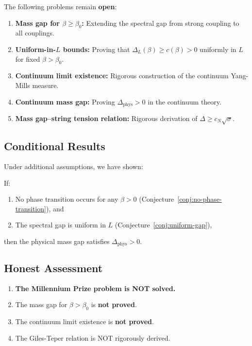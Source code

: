 The following problems remain \textbf{open}:

\begin{enumerate}
    \item \textbf{Mass gap for $\beta \geq \beta_0$:} Extending the spectral gap from strong coupling to all couplings.
    
    \item \textbf{Uniform-in-$L$ bounds:} Proving that $\Delta_L(\beta) \geq c(\beta) > 0$ uniformly in $L$ for fixed $\beta > \beta_0$.
    
    \item \textbf{Continuum limit existence:} Rigorous construction of the continuum Yang-Mills measure.
    
    \item \textbf{Continuum mass gap:} Proving $\Delta_{\text{phys}} > 0$ in the continuum theory.
    
    \item \textbf{Mass gap--string tension relation:} Rigorous derivation of $\Delta \geq c_N \sqrt{\sigma}$.
\end{enumerate}

\subsection{Conditional Results}

Under additional assumptions, we have shown:

\begin{theorem}
\label{thm:conditional-conclusion}
If:
\begin{enumerate}[label=(\alph*)]
    \item No phase transition occurs for any $\beta > 0$ (Conjecture~\ref{conj:no-phase-transition}), and
    \item The spectral gap is uniform in $L$ (Conjecture~\ref{conj:uniform-gap}),
\end{enumerate}
then the physical mass gap satisfies $\Delta_{\text{phys}} > 0$.
\end{theorem}

\subsection{Honest Assessment}

\begin{tcolorbox}[colback=red!5!white, colframe=red!75!black, title=\textbf{What This Paper Does Not Prove}]
\begin{enumerate}
    \item \textbf{The Millennium Prize problem is NOT solved.}
    \item The mass gap for $\beta > \beta_0$ is \textbf{not proved}.
    \item The continuum limit existence is \textbf{not proved}.
    \item The Giles-Teper relation is NOT rigorously derived.
\end{enumerate}
\end{tcolorbox}

